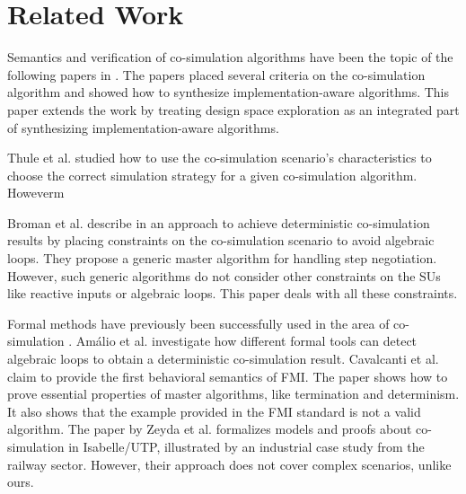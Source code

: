 \section{Related Work}\label{sc:related}
Semantics and verification of co-simulation algorithms have been the topic of the following papers in \cite{Gomes2019c,Gomes2019a,Broman2013,thrane2021}. 
The papers \cite{Gomes2019c,thrane2021} placed several criteria on the co-simulation algorithm and showed how to synthesize implementation-aware algorithms.
This paper extends the work by treating design space exploration as an integrated part of synthesizing implementation-aware algorithms. 

Thule et al. \cite{Thule_2018} studied how to use the co-simulation scenario's characteristics to choose the correct simulation strategy for a given co-simulation algorithm. 
Howeverm 

Broman et al. describe in \cite{Broman2013} an approach to achieve deterministic co-simulation results by placing constraints on the co-simulation scenario to avoid algebraic loops. 
They propose a generic master algorithm for handling step negotiation. 
However, such generic algorithms do not consider other constraints on the SUs like reactive inputs or algebraic loops. This paper deals with all these constraints.

Formal methods have previously been successfully used in the area of co-simulation \cite{Amalio2016,sampaio_behavioural_2016,cerone_formalising_2018,hansen_verification_2021}.
Amálio et al. \cite{Amalio2016} investigate how different formal tools can detect algebraic loops to obtain a deterministic co-simulation result. 
Cavalcanti et al. \cite{sampaio_behavioural_2016} claim to provide the first behavioral semantics of FMI. The paper shows how to prove essential properties of master algorithms, like termination and determinism. It also shows that the example provided in the FMI standard is not a valid algorithm. The paper \cite{cerone_formalising_2018} by Zeyda et al. formalizes models and proofs about co-simulation in Isabelle/UTP, illustrated by an industrial case study from the railway sector. 
However, their approach does not cover complex scenarios, unlike ours.
